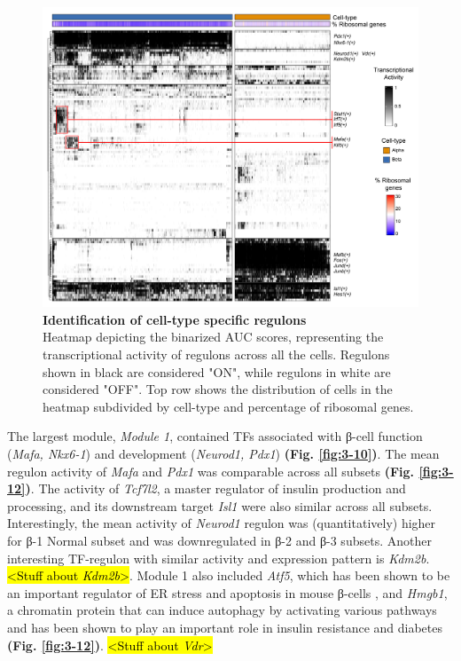 \begin{figure}[t]
\centering
\includegraphics[width=\linewidth]{Chapter5/Fig/F3-11-01.png}
\caption[Identification of cell-type specific regulons]{\textbf{Identification of cell-type specific regulons}\\Heatmap depicting the binarized AUC scores, representing the transcriptional activity of regulons across all the cells. Regulons shown in black are considered "ON", while regulons in white are considered "OFF". Top row shows the distribution of cells in the heatmap subdivided by cell-type and percentage of ribosomal genes.}
\label{fig:3-11}
\end{figure}

The largest module, \textit{Module 1}, contained TFs associated with β-cell function (\textit{Mafa, Nkx6-1}) and development (\textit{Neurod1, Pdx1}) \textbf{(Fig. \ref{fig:3-10})}. The mean regulon activity of \textit{Mafa} and \textit{Pdx1} was comparable across all subsets \textbf{(Fig. \ref{fig:3-12})}. The activity of \textit{Tcf7l2}, a master regulator of insulin production and processing, and its downstream target \textit{Isl1} were also similar across all subsets. Interestingly, the mean activity of \textit{Neurod1} regulon was (quantitatively) higher for β-1 Normal subset and was downregulated in β-2 and β-3 subsets. Another interesting TF-regulon with similar activity and expression pattern is \textit{Kdm2b}. \hl{<Stuff about \textit{Kdm2b}>}. Module 1 also included \textit{Atf5}, which has been shown to be an important regulator of ER stress and apoptosis in mouse β-cells \textbf{\cite{ma_atf5_2023}}, and \textit{Hmgb1}, a chromatin protein that can induce autophagy by activating various pathways and has been shown to play an important role in insulin resistance and diabetes \textbf{\cite{yang_relationship_2023}} \textbf{(Fig. \ref{fig:3-12})}. \hl{<Stuff about \textit{Vdr}>}\\

